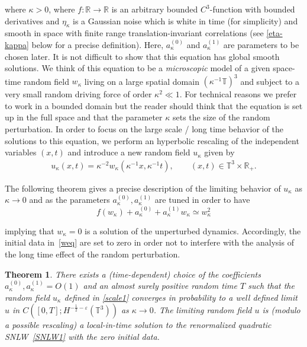 \documentclass[%
11pt,  reqno]{amsart}
\newtheorem{theorem}{Theorem} [section]
\newcommand{\1}{\hspace{0.2mm}\text{I}\hspace{0.2mm}}
\newcommand{\noi}{\noindent}
\newcommand{\R}{\mathbb{R}}
\newcommand{\T}{\mathbb{T}}
\newcommand{\eps}{\varepsilon}
\newcommand{\kk}{\kappa}
\numberwithin{equation}{section}
\numberwithin{theorem}{section}
\begin{document}
\noi
 where $\kk > 0$, where
$f:\R\to\R$ is an arbitrary bounded $C^3$-function with bounded derivatives and $\eta_{\kk}$ is a Gaussian noise which
is white in time (for simplicity) and smooth in space with finite range translation-invariant
correlations (see \eqref{eta-kappa} below for a precise definition). 
Here, $a_{\kk}^{(0)}$ and $a_{\kk}^{(1)}$
are parameters to be chosen later.
It is not difficult to show that this equation has global smooth solutions.
We think of this equation to be a \textit{microscopic} model of a given
space-time random field $w_{\kk}$ living on a large spatial domain $(\kk^{-1} \T)^3$ and subject to a very small random driving force of order $\kk^2 \ll 1$. For technical reasons we prefer to work in a bounded domain but the reader should think that the equation is set up in the full space and that the parameter $\kk$ sets the size of the random perturbation.  In order to focus on the large scale / long time behavior of the solutions to this equation,
 we perform an hyperbolic rescaling of the independent variables $(x, t)$ and introduce a new random field $u_\kk$ given by 
\begin{align}
u_{\kk} ( x, t) = \kk^{-2} w_{\kk} (\kk^{-1} x, \kk^{-1} t),
\qquad (x, t) \in \T^3 \times \R_+.
\label{scale1}
\end{align}


\noi
The following theorem gives a precise description of the limiting behavior of $u_\kk$ as $\kk\to 0$ and as the parameters $a_{\kk}^{(0)},a_{\kk}^{(1)}$ are tuned in order to have
\[
 f (w_{\kk})
   + a_{\kk}^{(0)} + a_{\kk}^{(1)} w_{\kk} \simeq w_\kk^2
\]


\noi
implying that $w_\kk =0$ is a solution of the unperturbed dynamics. 
Accordingly, the initial data in~\eqref{weq} are set to zero in order not to interfere with the analysis of the long time effect of the random perturbation.




\begin{theorem}\label{THM:weak}
There exists a \textup{(}time-dependent\textup{)} choice of the coefficients $a_{\kk}^{(0)},a_{\kk}^{(1)}=O(1)$ and 
an almost surely positive random time $T$ 
such that 
 the random field $u_\kk$ defined in \eqref{scale1} converges in probability to a well defined limit $u$
 in $C([0,T];H^{-\frac12 -\eps}(\T^3))$  as $\kk\to 0$. The limiting random field $u$ is 
 \textup{(}modulo a possible rescaling\textup{)} 
 a local-in-time solution to the  renormalized quadratic SNLW~\eqref{SNLW1} with the zero initial data.
\end{theorem}
\end{document}
